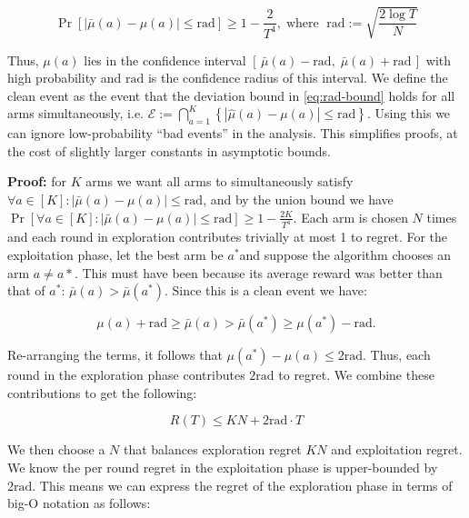 \documentclass[12pt]{article}
\begin{document}
\begin{equation}
\Pr\!\left[ \left| \bar{\mu}(a) - \mu(a) \right| \le \mathrm{rad} \right]
\ge 1 - \frac{2}{T^4},
\;\text{where }\;
\mathrm{rad} := \sqrt{\frac{2\log T}{N}}
\tag{3.1}
\label{eq:rad-bound}
\end{equation}

Thus, $\mu(a)$ lies in the confidence interval $[\, \bar{\mu}(a) - \mathrm{rad},\; \bar{\mu}(a) + \mathrm{rad} \,]$ with high probability and $\mathrm{rad}$ is the confidence radius of this interval. We define the clean event as the event that the deviation bound in \eqref{eq:rad-bound} holds for all arms simultaneously, i.e. $\mathcal{E} := \bigcap_{a=1}^K \left\{ |\hat{\mu}(a) - \mu(a)| \le \mathrm{rad} \right\}$. Using this we can ignore low-probability “bad events” in the analysis. This simplifies proofs, at the cost of slightly larger constants in asymptotic bounds.

\textbf{Proof:} for $K$ arms we want all arms to simultaneously satisfy $\forall a \in [K]: \left| \bar{\mu}(a) - \mu(a) \right| \le \mathrm{rad}$, 
and by the union bound we have $\Pr[\forall a \in [K]: |\bar{\mu}(a) - \mu(a)| \le \mathrm{rad}] \ge 1 - \frac{2K}{T^4}$. Each arm is chosen $N$ times and each round in exploration contributes trivially at most 1 to regret.  
For the exploitation phase, let the best arm be $a^*$and suppose the algorithm chooses an arm $a \neq a*$. This must have been
because its average reward was better than that of $a^*$: $\bar{\mu}(a) > \bar{\mu}(a^*).$ Since this is a clean event we have:

\[
\mu(a) + \mathrm{rad} \ge \bar{\mu}(a) > \bar{\mu}(a^*) \ge \mu(a^*) - \mathrm{rad}.
\]


\vspace{5mm}

Re-arranging the terms, it follows that $\mu(a^*) - \mu(a) \leq \mathrm{2rad}$. Thus, each round in the exploration phase contributes $\mathrm{2rad}$ to regret. We combine these contributions to get the following:

\[
R(T) \leq KN + \mathrm{2rad} \cdot T
\]

\vspace{5mm}

We then choose a $N$ that balances exploration regret $KN$ and exploitation regret. We know the per round regret  in the exploitation phase is upper-bounded by $\mathrm{2rad}$. This means we can express the regret of the exploration phase in terms of big-O notation as follows:
\end{document}

